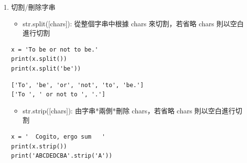 \documentclass[a4paper,12pt]{article}
\begin{document}
\begin{enumerate}
\begin{verbatim}
False
False
\end{verbatim}


\begin{itemize}
\item str.find(s): s 在字串中的位置(找到的第一個)\\
\end{itemize}
\lstset{breaklines=true,language=Python,label= ,caption= ,captionpos=b,firstnumber=1,numbers=left}
\begin{lstlisting}
x = 'HIHI Python'
print(x.find('HI'))
print(x.find('Python'))
print(x.find('python'))
\end{lstlisting}

\begin{verbatim}
0
5
-1
\end{verbatim}


\begin{itemize}
\item str.rfind(s): s 在字串中的位置(找到的最後一個)\\
\end{itemize}
\lstset{breaklines=true,language=Python,label= ,caption= ,captionpos=b,firstnumber=1,numbers=left}
\begin{lstlisting}
x = 'HIHI Python'
print(x.rfind('HI'))
print(x.rfind('Python'))
print(x.rfind('python'))
\end{lstlisting}

\begin{verbatim}
2
5
-1
\end{verbatim}

\item 切割/刪除字串
\label{sec:org8cf3454}
\begin{itemize}
\item str.split([chars]): 從整個字串中根據 chars 來切割，若省略 chars 則以空白進行切割\\
\end{itemize}
\lstset{breaklines=true,language=Python,label= ,caption= ,captionpos=b,firstnumber=1,numbers=left}
\begin{lstlisting}
x = 'To be or not to be.'
print(x.split())
print(x.split('be'))
\end{lstlisting}

\begin{verbatim}
['To', 'be', 'or', 'not', 'to', 'be.']
['To ', ' or not to ', '.']
\end{verbatim}


\begin{itemize}
\item str.strip([chars]): 由字串*兩側*刪除 chars，若省略 chars 則以空白進行切割\\
\end{itemize}
\lstset{breaklines=true,language=Python,label= ,caption= ,captionpos=b,firstnumber=1,numbers=left}
\begin{lstlisting}
x = '  Cogito, ergo sum   '
print(x.strip())
print('ABCDEDCBA'.strip('A'))
\end{lstlisting}


\end{enumerate}
\end{document}
